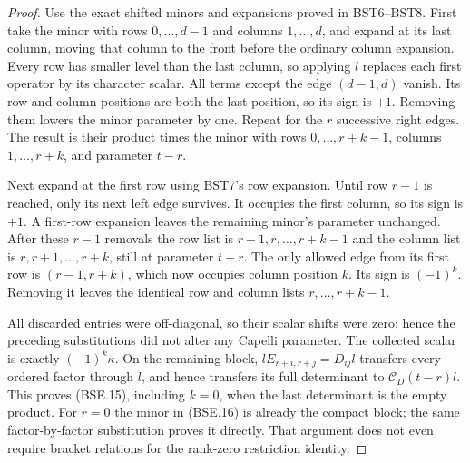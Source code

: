 \begin{proof}
Use the exact shifted minors and expansions proved in BST6--BST8.
First take the minor with rows $0,\ldots,d-1$ and columns
$1,\ldots,d$, and expand at its last column, moving that column
to the front before the ordinary column expansion.
Every row has smaller level than the last column, so applying $l$
replaces each first operator by its character scalar.
All terms except the edge $(d-1,d)$ vanish.
Its row and column positions are both the last position, so its
sign is $+1$.  Removing them lowers the minor parameter by one.
Repeat for the $r$ successive right edges.  The result is their
product times the minor with rows $0,\ldots,r+k-1$, columns
$1,\ldots,r+k$, and parameter $t-r$.

Next expand at the first row using BST7's row expansion.
Until row $r-1$ is reached, only its next left edge survives.
It occupies the first column, so its sign is $+1$.
A first-row expansion leaves the remaining minor's parameter
unchanged.  After these $r-1$ removals the row list is
$r-1,r,\ldots,r+k-1$ and the column list is
$r,r+1,\ldots,r+k$, still at parameter $t-r$.
The only allowed edge from its first row is $(r-1,r+k)$,
which now occupies column position $k$.  Its sign is $(-1)^k$.
Removing it leaves the identical row and column lists
$r,\ldots,r+k-1$.

All discarded entries were off-diagonal, so their scalar shifts
were zero; hence the preceding substitutions did not alter any
Capelli parameter.  The collected scalar is exactly
$(-1)^k\kappa$.  On the remaining block,
$lE_{r+i,r+j}=D_{ij}l$ transfers every ordered factor through $l$,
and hence transfers its full determinant to
$\mathcal C_D(t-r)l$.  This proves (BSE.15), including $k=0$,
when the last determinant is the empty product.
For $r=0$ the minor in (BSE.16) is already the compact block;
the same factor-by-factor substitution proves it directly.
That argument does not even require bracket relations for the
rank-zero restriction identity.
\end{proof}


